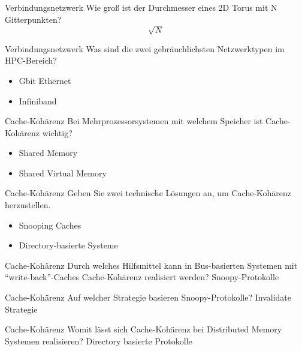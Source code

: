 \begin{aufgabe}{Verbindungsnetzwerk}
    Wie groß ist der Durchmesser eines 2D Torus mit N Gitterpunkten?
    \tcblower
    $$\sqrt{N}$$
\end{aufgabe}

\begin{aufgabe}{Verbindungsnetzwerk}
    Was sind die zwei gebräuchlichsten Netzwerktypen im HPC-Bereich?
    \tcblower
    \begin{itemize}
        \item Gbit Ethernet
        \item Infiniband
    \end{itemize}
\end{aufgabe}

\begin{aufgabe}{Cache-Kohärenz}
    Bei Mehrprozessorsystemen mit welchem Speicher ist Cache-Kohärenz wichtig?
    \tcblower
    \begin{itemize}
        \item Shared Memory
        \item Shared Virtual Memory
    \end{itemize}
\end{aufgabe}

\begin{aufgabe}{Cache-Kohärenz}
    Geben Sie zwei technische Lösungen an, um Cache-Kohärenz herzustellen.
    \tcblower
    \begin{itemize}
        \item Snooping Caches
        \item Directory-basierte Systeme
    \end{itemize}
\end{aufgabe}

\begin{aufgabe}{Cache-Kohärenz}
    Durch welches Hilfsmittel kann in Bus-basierten Systemen mit \enquote{write-back}-Caches Cache-Kohärenz realisiert werden?
    \tcblower
    Snoopy-Protokolle
\end{aufgabe}

\begin{aufgabe}{Cache-Kohärenz}
    Auf welcher Strategie basieren Snoopy-Protokolle?
    \tcblower
    Invalidate Strategie
\end{aufgabe}

\begin{aufgabe}{Cache-Kohärenz}
    Womit lässt sich Cache-Kohärenz bei Distributed Memory Systemen realisieren?
    \tcblower
    Directory basierte Protokolle
\end{aufgabe}

